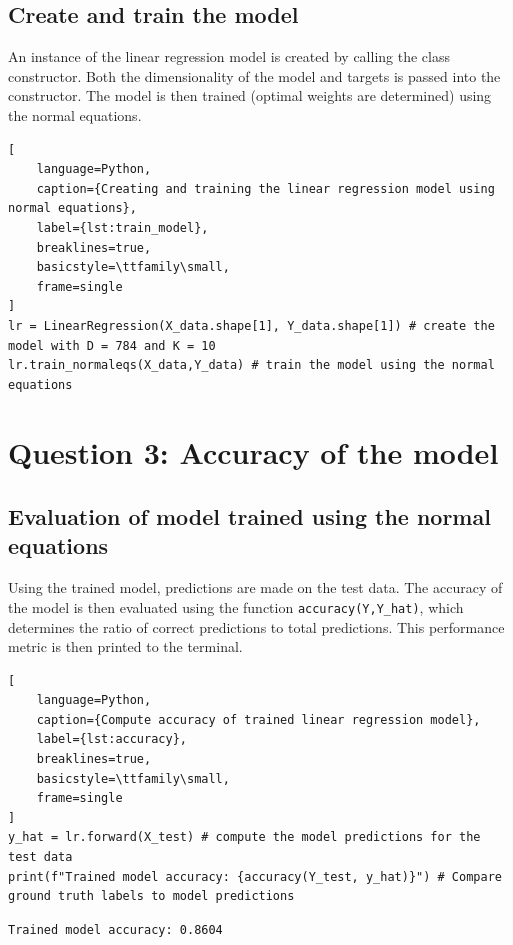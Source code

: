 \documentclass[11pt]{article}
\begin{document}
\subsection{Create and train the model}
An instance of the linear regression model is created by calling the class constructor. Both the dimensionality of the model and targets is passed into the constructor. 
The model is then trained (optimal weights are determined) using the normal equations. 

\begin{lstlisting}[
    language=Python, 
    caption={Creating and training the linear regression model using normal equations},
    label={lst:train_model},
    breaklines=true,
    basicstyle=\ttfamily\small,
    frame=single
]
lr = LinearRegression(X_data.shape[1], Y_data.shape[1]) # create the model with D = 784 and K = 10
lr.train_normaleqs(X_data,Y_data) # train the model using the normal equations
\end{lstlisting}

\section{Question 3: Accuracy of the model}
\subsection{Evaluation of model trained using the normal equations}
Using the trained model, predictions are made on the test data. The accuracy of the model is then evaluated using the function \texttt{accuracy(Y,Y\_hat)}, which determines 
the ratio of correct predictions to total predictions. This performance metric is then printed to the terminal. 
\begin{lstlisting}[
    language=Python, 
    caption={Compute accuracy of trained linear regression model},
    label={lst:accuracy},
    breaklines=true,
    basicstyle=\ttfamily\small,
    frame=single
]
y_hat = lr.forward(X_test) # compute the model predictions for the test data
print(f"Trained model accuracy: {accuracy(Y_test, y_hat)}") # Compare ground truth labels to model predictions
\end{lstlisting}
\begin{lstlisting}[style=terminal, caption={Code execution output}]
Trained model accuracy: 0.8604
\end{lstlisting}
\end{document}
